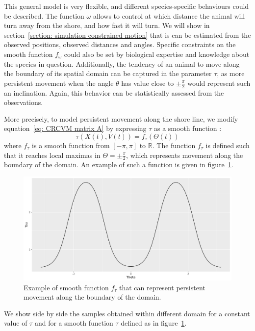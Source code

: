 \documentclass[11pt]{article}
\newcommand {\R}{\mathbb{R}}
\newcommand {\1}{\mathbb{1}}
\theoremstyle{definition}
\theoremstyle{remark}
\theoremstyle{remark}
\begin{document}
 This general model is very flexible, and different species-specific behaviours could be described. The function $\omega$ allows to control at which distance the animal will turn away from the shore, and how fast it will turn. We will show in section~\ref{section: simulation constrained motion} that is can be estimated from the observed positions, observed distances and angles. Specific constraints on the smooth function $f_{\omega}$ could also be set by biological expertise and knowledge about the species in question. Additionally, the tendency of an animal to move along the boundary of its spatial domain can be captured in the parameter $\tau$, as more persistent movement when the angle $\theta$ has value close to $\pm\frac{\pi}{2}$ would represent such an inclination. Again, this behavior can be statistically assessed from the observations. 
 
 More precisely, to model persistent movement along the shore line, we modify equation~\ref{eq: CRCVM matrix A} by expressing $\tau$ as a smooth function :
 \[\tau(X(t),V(t))=f_{\tau}(\Theta(t))\] where $f_{\tau}$ is a smooth function from $[-\pi,\pi]$ to $\R$.
 The function $f_{\tau}$ is defined such that it reaches local maximas in $\Theta=\pm\frac{\pi}{2}$, which represents movement along the boundary of the domain. An example of such a function is given in figure~\ref{fig:smoothtaubump}.
 \begin{figure}[H]
 	\centering
 	\includegraphics[scale=0.3]{images/crcvm/smooth_tau_bump}
 	\caption{Example of smooth function $f_{\tau}$ that can represent persistent movement along the boundary of the domain.}
 	\label{fig:smoothtaubump}
 \end{figure}
 
 We show side by side the samples obtained within different domain for a constant value of $\tau$ and for a smooth function $\tau$ defined as in figure~\ref{fig:smoothtaubump}.
 
\end{document}
